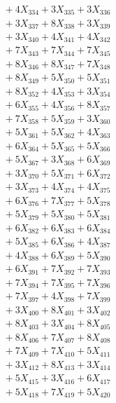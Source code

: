 \documentclass[a4paper,10pt]{article}
\begin{document}
{\begin{align}
&\;  + 4 X_{334} + 3 X_{335} + 3 X_{336} \\[0.3ex]
&\;  + 3 X_{337} + 8 X_{338} + 3 X_{339} \\[0.5ex]\allowbreak
&\;  + 3 X_{340} + 4 X_{341} + 4 X_{342} \\[0.3ex]
&\;  + 7 X_{343} + 7 X_{344} + 7 X_{345} \\[0.3ex]
&\;  + 8 X_{346} + 8 X_{347} + 7 X_{348} \\[0.3ex]
&\;  + 8 X_{349} + 5 X_{350} + 5 X_{351} \\[0.3ex]
&\;  + 8 X_{352} + 4 X_{353} + 3 X_{354} \\[0.3ex]
&\;  + 6 X_{355} + 4 X_{356} + 8 X_{357} \\[0.3ex]
&\;  + 7 X_{358} + 5 X_{359} + 3 X_{360} \\[0.3ex]
&\;  + 5 X_{361} + 5 X_{362} + 4 X_{363} \\[0.3ex]
&\;  + 6 X_{364} + 5 X_{365} + 5 X_{366} \\[0.3ex]
&\;  + 5 X_{367} + 3 X_{368} + 6 X_{369} \\[0.5ex]\allowbreak
&\;  + 3 X_{370} + 5 X_{371} + 6 X_{372} \\[0.3ex]
&\;  + 3 X_{373} + 4 X_{374} + 4 X_{375} \\[0.3ex]
&\;  + 6 X_{376} + 7 X_{377} + 5 X_{378} \\[0.3ex]
&\;  + 5 X_{379} + 5 X_{380} + 5 X_{381} \\[0.3ex]
&\;  + 6 X_{382} + 6 X_{383} + 6 X_{384} \\[0.3ex]
&\;  + 5 X_{385} + 6 X_{386} + 4 X_{387} \\[0.3ex]
&\;  + 4 X_{388} + 6 X_{389} + 5 X_{390} \\[0.3ex]
&\;  + 6 X_{391} + 7 X_{392} + 7 X_{393} \\[0.3ex]
&\;  + 7 X_{394} + 7 X_{395} + 7 X_{396} \\[0.3ex]
&\;  + 7 X_{397} + 4 X_{398} + 7 X_{399} \\[0.5ex]\allowbreak
&\;  + 3 X_{400} + 8 X_{401} + 3 X_{402} \\[0.3ex]
&\;  + 8 X_{403} + 3 X_{404} + 8 X_{405} \\[0.3ex]
&\;  + 8 X_{406} + 7 X_{407} + 8 X_{408} \\[0.3ex]
&\;  + 7 X_{409} + 7 X_{410} + 5 X_{411} \\[0.3ex]
&\;  + 3 X_{412} + 8 X_{413} + 3 X_{414} \\[0.3ex]
&\;  + 5 X_{415} + 3 X_{416} + 6 X_{417} \\[0.3ex]
&\;  + 5 X_{418} + 7 X_{419} + 5 X_{420} \\[0.3ex]

\end{align}}
\end{document}
